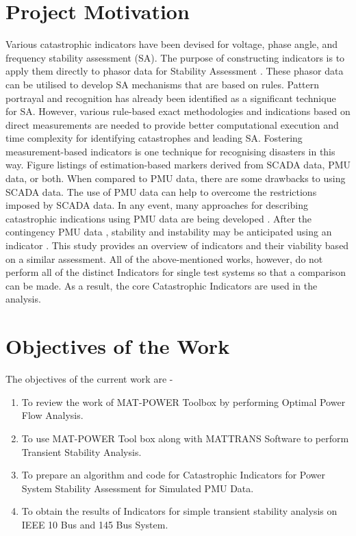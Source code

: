 \section{Project Motivation} 
Various catastrophic indicators have been devised for voltage, phase angle, and frequency stability assessment (SA). The purpose of constructing indicators is to apply them directly to phasor data for Stability Assessment \cite{1}\cite{2}. These phasor data can be utilised to develop SA mechanisms that are based on rules. Pattern portrayal and recognition has already been identified as a significant technique for SA. However, various rule-based exact methodologies and indications based on direct measurements are needed to provide better computational execution and time complexity for identifying catastrophes and leading SA. Fostering measurement-based indicators is one technique for recognising disasters in this way. Figure listings of estimation-based markers derived from SCADA data, PMU data, or both. When compared to PMU data, there are some drawbacks to using SCADA data. The use of PMU data can help to overcome the restrictions imposed by SCADA data. In any event, many approaches for describing catastrophic indications using PMU data are being developed \cite{L7}. After the contingency PMU data \cite{5}\cite{I5}, stability and instability may be anticipated using an indicator \cite{I3}. This study provides an overview of indicators and their viability based on a similar assessment. All of the above-mentioned works, however, do not perform all of the distinct Indicators for single test systems so that a comparison can be made. As a result, the core Catastrophic Indicators are used in the analysis.


\section{Objectives of the Work}
\noindent The objectives of the current work are -
\begin{enumerate}
\item To review the work of MAT-POWER Toolbox by performing Optimal Power Flow Analysis.
\item To use MAT-POWER Tool box along with MATTRANS Software to perform Transient Stability Analysis.
\item To prepare an algorithm and code for Catastrophic Indicators for Power System Stability Assessment for Simulated PMU Data.
\item To obtain the results of Indicators for simple transient stability analysis on IEEE 10 Bus and 145 Bus System.
\end{enumerate} 

